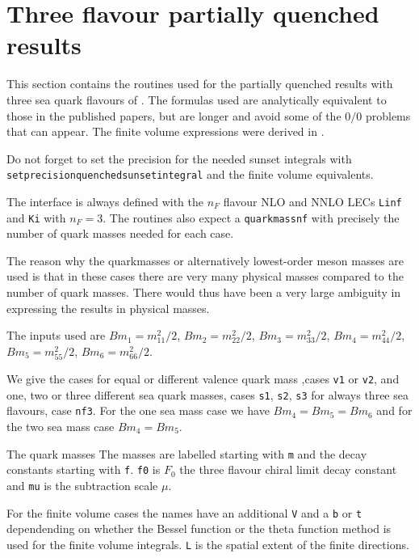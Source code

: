 \documentclass[12pt,a4paper]{article}
\newcommand{\mytt}[1]{\texttt{#1}}
\newcommand{\newfunction}[1]{\mytt{#1}\index{\mytt{#1}}}
\begin{document}
\section{Three flavour partially quenched results}

This section contains the routines used for the partially quenched
results with three sea quark flavours
of \cite{Bijnens:2006jv,Bijnens:2005ae,Bijnens:2004hk}.
The formulas used are analytically equivalent to those in the published
papers, but are longer and avoid some of the $0/0$ problems that can appear.
The finite volume expressions were derived in \cite{Bijnens:2015dra}.

Do not forget to set the precision for the needed sunset integrals
with\\ \mytt{setprecisionquenchedsunsetintegral} and the finite volume
equivalents.

The interface is always defined with the $n_F$ flavour NLO and NNLO LECs
\newfunction{Linf} and \newfunction{Ki} with $n_F=3$. The routines also
expect a \newfunction{quarkmassnf} with precisely the number of quark masses
needed for each case.

The reason why the quarkmasses or alternatively lowest-order meson masses
are used is that in these cases there are very many physical masses
compared to the number of quark masses. There would thus have been a very
large ambiguity in expressing the results in physical masses.

The inputs used are $Bm_1=m_{11}^2/2$, $Bm_2=m_{22}^2/2$,
$Bm_3=m_{33}^2/2$, $Bm_4=m_{44}^2/2$, $Bm_5=m_{55}^2/2$,  $Bm_6=m_{66}^2/2$.

We give the cases for equal or different valence quark mass ,cases \mytt{v1}
or \mytt{v2}, and one, two or three different sea quark masses,
cases \mytt{s1}, \mytt{s2}, \mytt{s3} for always three sea flavours, case \mytt{nf3}. For the one sea mass case we have $Bm_4=Bm_5=Bm_6$ and for the two sea
mass case $Bm_4=Bm_5$.

The quark masses 
The masses are labelled starting with \mytt{m} and the decay constants starting with \mytt{f}. \mytt{f0} is $F_0$ the three flavour chiral limit decay constant
and \mytt{mu} is the subtraction scale $\mu$.

For the finite volume cases the names have an additional \mytt{V}
and a \mytt{b} or \mytt{t} dependending on whether the Bessel
function or the theta function method is used for the finite volume
integrals. \mytt{L} is the spatial extent of the finite directions.
\end{document}
